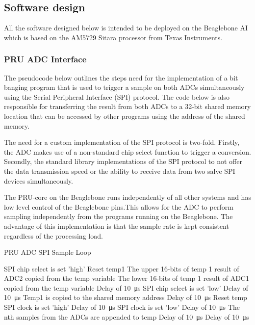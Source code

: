 \subsection{Software design}
All the software designed below is intended to be deployed on the Beaglebone AI which is based on the AM5729 Sitara processor from Texas Instruments. 

\subsubsection{PRU ADC Interface}
\label{sec:PRU}
The pseudocode below outlines the steps need for the implementation of a bit banging program that is used to trigger a sample on both ADCs simultaneously using the Serial Peripheral Interface (SPI) protocol. The code below is also responsible for transferring the result from both ADCs to a 32-bit shared memory location that can be accessed by other programs using the address of the shared memory.  
\par
The need for a custom implementation of the SPI protocol is two-fold. Firstly, the ADC makes use of a non-standard chip select function to trigger a conversion. Secondly, the standard library implementations of the SPI protocol to not offer the data transmission speed or the ability to receive data from two salve SPI devices simultaneously.
\par 
The PRU-core on the Beaglebone runs independently of all other systems and has low level control of the Beaglebone pins.This allows for  the ADC to perform sampling independently from the programs running on the Beaglebone. The advantage of this implementation is that the sample rate is kept consistent regardless of the processing load. 
\begin{algorithm}[H]
\caption{PRU ADC SPI Sample Loop}
\label{alg:Pru_Sample}
\begin{algorithmic}
\State  SPI chip select is set 'high'
\State  Reset temp1
\State  The upper 16-bits of temp 1 result of ADC2 copied from the temp variable
\State  The lower 16-bits of temp 1 result of ADC1 copied from the temp variable
\State  Delay of \qty{10}{\us}
\State  SPI chip select is set 'low'
\State  Delay of \qty{10}{\us}
\State  Temp1 is copied to the shared memory address 
\State  Delay of \qty{10}{\us}
\State  Reset temp
\State SPI clock is set 'high'
\State Delay of \qty{10}{\us}
\State SPI clock is set 'low'
\State Delay of \qty{10}{\us}
\State The nth samples from the ADCs are appended to temp
\State Delay of \qty{10}{\us}
\EndFor
\State  Delay of \qty{10}{\us}
\EndWhile
\end{algorithmic}
\end{algorithm}

